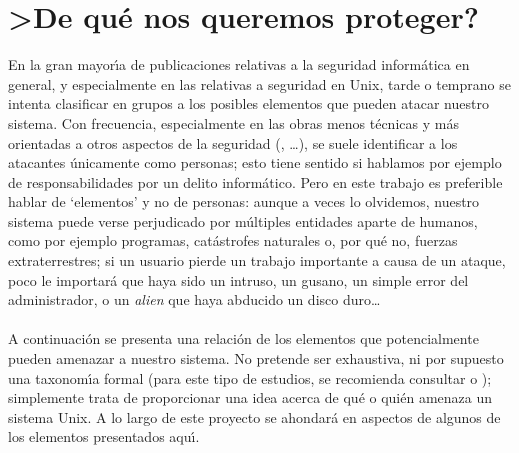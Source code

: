 \section{>De qu\'e nos queremos proteger?}
En la gran mayor\'{\i}a de publicaciones relativas a la seguridad inform\'atica 
en general, y 
especialmente en las relativas a seguridad en Unix, tarde o temprano se intenta 
clasificar en grupos a los posibles e\-le\-men\-tos que pueden atacar 
nuestro sistema. Con frecuencia, especialmente en las obras menos t\'ecnicas 
y m\'as orientadas a otros aspectos de la seguridad 
(\cite{kn:isv95}, \cite{kn:mey89}\ldots), se suele identificar a los atacantes 
\'unicamente como personas; esto tiene sentido si hablamos por ejemplo de
res\-pon\-sa\-bi\-li\-da\-des por un delito inform\'atico. Pero en este 
trabajo es preferible hablar de `elementos' y no de personas: aunque a 
veces lo olvidemos, nuestro sistema puede verse perjudicado por m\'ultiples 
entidades aparte de humanos, como por ejemplo programas, cat\'astrofes 
naturales o, por qu\'e no, fuerzas 
extraterrestres; si un usuario pierde un trabajo importante a causa de un 
ataque, poco le importar\'a que haya sido un intruso, un gusano, un simple 
error del administrador, o un {\it alien} que haya abducido un disco duro\ldots
\\
\\A continuaci\'on se presenta una relaci\'on de los elementos que 
potencialmente
pueden amenazar a nuestro sistema. No pretende ser exhaustiva, ni por supuesto
una taxonom\'{\i}a formal (para este tipo de estudios, se recomienda consultar 
\cite{kn:lan94} o \cite{kn:aks96}); simplemente trata de proporcionar una idea
acerca de qu\'e o qui\'en amenaza un sistema Unix. A lo largo de este proyecto
se ahondar\'a en aspectos de algunos de los elementos presentados aqu\'{\i}.
